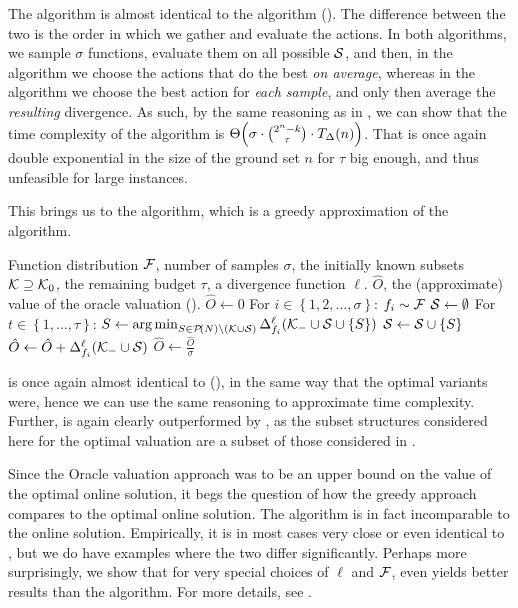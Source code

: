 The \algRO{} algorithm is almost identical to the \algFO{} algorithm ().
The difference between the two is the order in which we gather and evaluate the actions.
In both algorithms, we sample $ \sigma $ functions, evaluate them on all possible $ \s $, and then, in the \algFO{} algorithm we choose the actions that do the best \emph{on average}, whereas in the \algRO{} algorithm we choose the best action for \emph{each sample}, and only then average the \emph{resulting} divergence.
As such, by the same reasoning as in , we can show that the time complexity of the \algRO{} algorithm is $ \fce\Theta{\sigma \cdot \binom{2^n-k}{\tau} \cdot \fce\divt{n}} $.
That is once again double exponential in the size of the ground set $ n $ for $ \tau $ big enough, and thus unfeasible for large instances.

This brings us to the \algRG{} algorithm, which is a greedy approximation of the \algRO{} algorithm.

\begin{algor}{\algRG{}}{Function distribution $ \fdist $, number of samples $ \sigma $, the initially known subsets $ \k \supseteq \k_0 $, the remaining budget $ \tau $, a divergence function $ \ell $.}
  {$ \hat{O} $, the (approximate) value of the oracle valuation ().}
  \State $ \hat{O} \gets 0 $
  \Indent For $ i \in \left\{ 1, 2, \ldots, \sigma \right\} $:
  \State $ f_i \sim \fdist $
  \State $ \s \gets \emptyset $
  \Indent For $ t \in \left\{ 1, \dots, \tau \right\} $:
  \State $ S \gets \argmin_{S \in \pot N \setminus \left( \k \cup \s \right)} \divg[f_i] \ell {\k_- \cup \s \cup \left\{ S \right\}} $
  \State $ \s \gets \s \cup \left\{ S \right\} $
  \EndIndent
  \State $ \hat{O} \gets \hat{O} + \divg[f_i] \ell {\k_- \cup \s} $
  \EndIndent
  \State $ \hat O \gets \frac{\hat O}{\sigma} $
\end{algor}

\algRG{} is once again almost identical to \algFG{} (), in the same way that the optimal variants were, hence we can use the same reasoning to approximate time complexity.
Further, \algRG{} is again clearly outperformed by \algRO{}, as the subset structures considered here for the optimal valuation are a subset of those considered in \algRO{}.

Since the Oracle valuation approach was to be an upper bound on the value of the optimal online solution, it begs the question of how the greedy approach compares to the optimal online solution.
The \algRG{} algorithm is in fact incomparable to the online solution.
Empirically, it is in most cases very close or even identical to \algRO{}, but we do have examples where the two differ significantly.
Perhaps more surprisingly, we show that for very special choices of $ \ell $ and $ \fdist $, even \algFG{} yields better results than the \algRG{} algorithm.
For more details, see .

